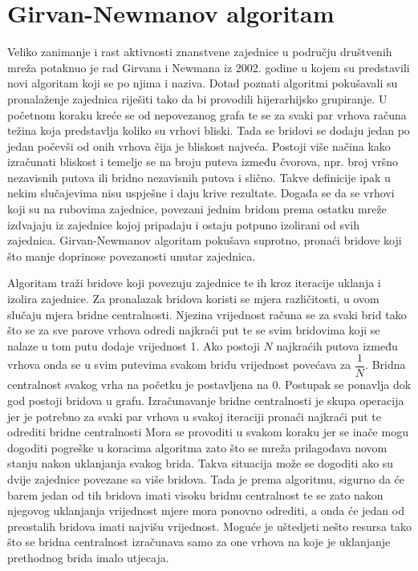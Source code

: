 \section{Girvan-Newmanov algoritam}

Veliko zanimanje i rast aktivnosti znanstvene zajednice u području društvenih mreža potaknuo je rad Girvana i Newmana iz 2002. godine \cite{girvan2002community} u kojem su predstavili novi algoritam koji se po njima i naziva. Dotad poznati algoritmi pokušavali su pronalaženje zajednica riješiti tako da bi provodili hijerarhijsko grupiranje. U početnom koraku kreće se od nepovezanog grafa te se za svaki par vrhova računa težina koja predstavlja koliko su vrhovi bliski. Tada se bridovi se dodaju jedan po jedan počevši od onih vrhova čija je bliskost najveća. Postoji više načina kako izračunati bliskost i temelje se na broju puteva između čvorova, npr. broj vršno nezavisnih putova ili bridno nezavisnih putova i slično. Takve definicije ipak u nekim slučajevima nisu uspješne i daju krive rezultate. Događa se da se vrhovi koji su na rubovima zajednice, povezani jednim bridom prema ostatku mreže izdvajaju iz zajednice kojoj pripadaju i ostaju potpuno izolirani od svih zajednica. Girvan-Newmanov algoritam pokušava suprotno, pronaći bridove koji što manje doprinose povezanosti unutar zajednica. 

Algoritam traži bridove koji povezuju zajednice te ih kroz iteracije uklanja i izolira zajednice. Za pronalazak bridova koristi se mjera različitosti, u ovom slučaju mjera bridne centralnosti. Njezina vrijednost računa se za svaki brid tako što se za sve parove vrhova odredi najkraći put te se svim bridovima koji se nalaze u tom putu dodaje vrijednost 1. Ako postoji $N$ najkraćih putova između vrhova onda se u svim putevima svakom bridu vrijednost povećava za $ \dfrac{1}{N} $. Bridna centralnost svakog vrha na početku je postavljena na 0. Postupak se ponavlja dok god postoji bridova u grafu. Izračunavanje bridne centralnosti je skupa operacija jer je potrebno za svaki par vrhova u svakoj iteraciji pronaći najkraći put te odrediti bridne centralnosti Mora se provoditi u svakom koraku jer se inače mogu dogoditi pogreške u koracima algoritma zato što se mreža prilagođava novom stanju nakon uklanjanja svakog brida. Takva situacija može se dogoditi ako su dvije zajednice povezane sa više bridova. Tada je prema algoritmu, sigurno da će barem jedan od tih bridova imati visoku bridnu centralnost te se zato nakon njegovog uklanjanja vrijednost mjere mora ponovno odrediti, a onda će jedan od preostalih bridova imati najvišu vrijednost. Moguće je uštedjeti nešto resursa tako što se bridna centralnost izračunava samo za one vrhova na koje je uklanjanje prethodnog brida imalo utjecaja. 

